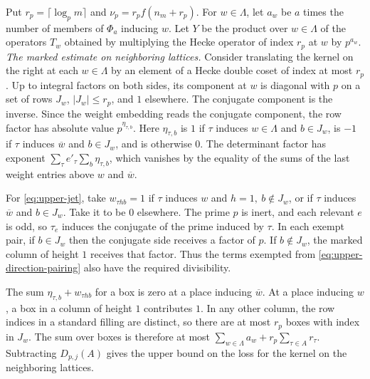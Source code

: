 Put \(r_p=\lceil\log_p m\rceil\) and \(\nu_p=r_pf(n_m+r_p)\).
For \(w\in\Lambda\), let \(a_w\) be \(a\) times the number of members of
\(\Phi_a\) inducing \(w\).
Let \(Y\) be the product over \(w\in\Lambda\) of the operators \(T_w\)
obtained by multiplying the Hecke operator of index \(r_p\) at \(w\)
by \(p^{a_w}\).
\emph{The marked estimate on neighboring lattices.}
Consider translating the kernel on the right at each \(w\in\Lambda\)
by an element of a Hecke double coset of index at most \(r_p\).
Up to integral factors on both sides, its component at \(w\)
is diagonal with \(p\) on a set of rows \(J_w\), \(|J_w|\le r_p\),
and \(1\) elsewhere. The conjugate component is the inverse.
Since the weight embedding reads the conjugate component, the row
factor has absolute value \(p^{\eta_{\tau,b}}\).
Here \(\eta_{\tau,b}\) is \(1\) if \(\tau\) induces \(w\in\Lambda\)
and \(b\in J_w\), is \(-1\) if \(\tau\) induces \(\overline w\)
and \(b\in J_w\), and is otherwise \(0\).
The determinant factor has exponent \(\sum_\tau e'_\tau\sum_b\eta_{\tau,b}\),
which vanishes by the equality of the sums of the last weight
entries above \(w\) and \(\overline w\).

For \eqref{eq:upper-jet}, take \(w_{\tau h b}=1\) if \(\tau\) induces
\(w\) and \(h=1,\ b\notin J_w\), or if \(\tau\) induces \(\overline w\)
and \(b\in J_w\). Take it to be \(0\) elsewhere.
The prime \(p\) is inert, and each relevant \(e\) is odd, so
\(\tau_e\) induces the conjugate of the prime induced by \(\tau\).
In each exempt pair, if \(b\in J_w\) then the conjugate side
receives a factor of \(p\). If \(b\notin J_w\), the marked column
of height \(1\) receives that factor. Thus the terms exempted from
\eqref{eq:upper-direction-pairing} also have the required divisibility.

The sum \(\eta_{\tau,b}+w_{\tau h b}\) for a box is zero at a place
inducing \(\overline w\). At a place inducing \(w\), a box in a
column of height \(1\) contributes \(1\). In any other column,
the row indices in a standard filling are distinct, so there are
at most \(r_p\) boxes with index in \(J_w\).
The sum over boxes is therefore at most
\(\sum_{w\in\Lambda}a_w+r_p\sum_{\tau\in A}r_\tau\).
Subtracting \(D_{p,j}(A)\) gives the upper bound on the loss
for the kernel on the neighboring lattices.

